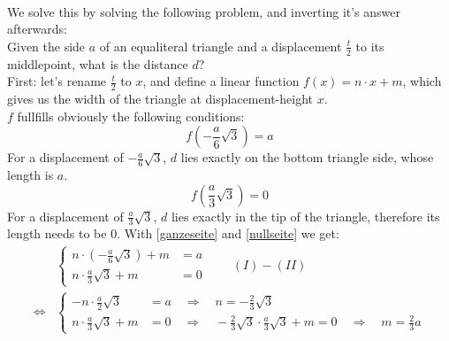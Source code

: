 \documentclass[12pt]{article}
\begin{document}
\begin{minipage}[r]{0.48\textwidth}
\begin{figure}[H]
\centering
{}
\end{figure}
\end{minipage}\\\clearpage
\noindent We solve this by solving the following problem, and inverting it's answer afterwards:\\
Given the side $a$ of an equaliteral triangle and a displacement $\frac{t}{2}$ to its middlepoint, what is the distance $d$?\\
First: let's rename $\frac{t}{2}$ to $x$, and define a linear function $f(x)=n\cdot x + m$, which gives us the width of the triangle at displacement-height $x$.\\
$f$ fullfills obviously the following conditions:
\begin{equation}
f\left(-\frac{a}{6}\sqrt{3}\right)=a\label{ganzeseite}
\end{equation}
For a displacement of $-\frac{a}{6}\sqrt{3}$, $d$ lies exactly on the bottom triangle side, whose length is $a$.
\begin{equation}
f\left(\frac{a}{3}\sqrt{3}\right)=0\label{nullseite}
\end{equation}
For a displacement of $\frac{a}{3}\sqrt{3}$, $d$ lies exactly in the tip of the triangle, therefore its length needs to be $\num{0}$.
With \autoref{ganzeseite} and \autoref{nullseite} we get:
\begin{align}
&\begin{cases} n\cdot\left(-\frac{a}{6}\sqrt{3}\right)+m&=a\\ n\cdot\frac{a}{3}\sqrt{3}+m&=0\end{cases}\qquad (I)-(II)\nonumber\\
\Leftrightarrow &\begin{cases} -n\cdot\frac{a}{2}\sqrt{3}&=a\quad\Rightarrow\quad n=-\frac{2}{3}\sqrt{3}\\ n\cdot\frac{a}{3}\sqrt{3}+m&=0\quad\Rightarrow\quad -\frac{2}{3}\sqrt{3}\cdot\frac{a}{3}\sqrt{3}+m=0\quad\Rightarrow\quad m=\frac{2}{3}a\end{cases}\label{geloestefunktion}
\end{align}
\end{document}
